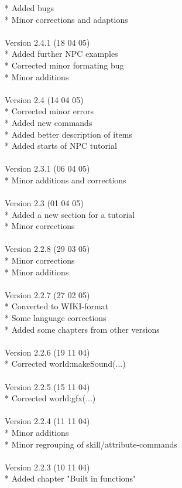 \documentclass[a4paper,10pt,makeidx]{scrreprt}
\begin{document}
* Added bugs\\
* Minor corrections and adaptions\\
\\
Version 2.4.1 (18 04 05)\\
* Added further NPC examples\\
* Corrected minor formating bug\\
* Minor additions\\
\\
Version 2.4 (14 04 05)\\
* Corrected minor errors\\
* Added new commands\\
* Added better description of items\\
* Added starts of NPC tutorial\\
\\
Version 2.3.1 (06 04 05)\\
* Minor additions and corrections\\
\\
Version 2.3 (01 04 05)\\
* Added a new section for a tutorial\\
* Minor corrections\\
\\
Version 2.2.8 (29 03 05)\\
* Minor corrections\\
* Minor additions\\
\\
Version 2.2.7 (27 02 05)\\
* Converted to WIKI-format\\
* Some language corrections\\
* Added some chapters from other versions\\
\\
Version 2.2.6 (19 11 04)\\
* Corrected world:makeSound(...)\\
\\
Version 2.2.5 (15 11 04)\\
* Corrected world:gfx(...)\\
\\
Version 2.2.4 (11 11 04)\\
* Minor additions\\
* Minor regrouping of skill/attribute-commands\\
\\
Version 2.2.3 (10 11 04)\\
* Added chapter "Built in functions"\\
\end{document}

